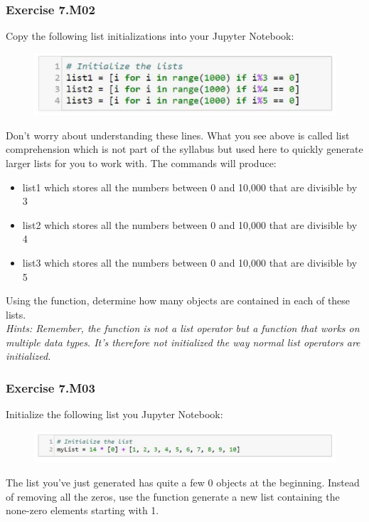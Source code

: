 \subsubsection*{Exercise 7.M02}
Copy the following list initializations into your Jupyter Notebook:
\begin{figure}[H]
		\centering
		\includegraphics[width=\textwidth]{../IMG/7M02.png} 
\end{figure}
Don’t worry about understanding these lines. What you see above is called list
comprehension which is not part of the syllabus but used here to quickly generate larger
lists for you to work with. The commands will produce:
\begin{itemize}
	\item list1 which stores all the numbers between 0 and 10,000 that are divisible by 3
	\item list2 which stores all the numbers between 0 and 10,000 that are divisible by 4
	\item list3 which stores all the numbers between 0 and 10,000 that are divisible by 5
\end{itemize}

Using the {} function, determine how many objects are contained in each of these lists.\\


\textit{Hints:
Remember, the {} function is not a list operator but a function that works on multiple data types. It’s therefore not initialized the way normal list operators are initialized.}\\[1cm]




\subsubsection*{Exercise 7.M03}
Initialize the following list you Jupyter Notebook:
\begin{figure}[H]
		\centering
		\includegraphics[width=\textwidth]{../IMG/7M03.png} 
\end{figure}
The list you’ve just generated has quite a few 0 objects at the beginning. Instead of removing
all the zeros, use the {} function generate a new list containing the none-zero
elements starting with 1.\\


